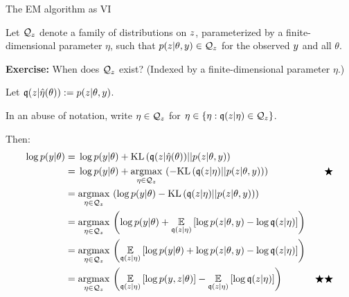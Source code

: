
\begin{frame}{The EM algorithm as VI}

Let $\mathcal{Q}_z$ denote a family of distributions on $z$, parameterized by a
finite-dimensional parameter $\eta$, such that $p(z | \theta, y) \in \mathcal{Q}_z$
for the observed $y$ and all $\theta$.

\textbf{Exercise:} When does $\mathcal{Q}_z$ exist?  (Indexed by a
finite-dimensional parameter $\eta$.)

\pause

Let $\mathfrak{q}(z | \hat{\eta}(\theta)) := p(z | \theta, y)$.

In an abuse of notation,
write $\eta \in \mathcal{Q}_z$ for $\eta \in \{\eta: \mathfrak{q}(z | \eta) \in \mathcal{Q}_z \}$.

\pause

Then:
%
\begin{align*}
%
\log p(\y | \theta) ={}&
\log p(\y | \theta) + \kl{\q(\z | \etaopt(\theta))}{p(\z | \theta, \y)}
\\={}&
\log p(\y | \theta) + \argmax{\eta \in \qdom_z}\left( -
    \kl{\q(\z | \eta)}{p(\z | \theta, \y)} \right) & \bigstar
\\={}&
\argmax{\eta \in \qdom_z} \left(
    \log p(\y | \theta) -
    \kl{\q(\z | \eta)}{p(\z | \theta, \y)}\right)
\\={}&
\argmax{\eta \in \qdom_z} \left(
\log p(\y | \theta) +
\expect{\q(\z | \eta)}{
    \log p(\z | \theta, \y) - \log \q(\z | \eta)
}\right)
\\={}&
\argmax{\eta \in \qdom_z} \left(
\expect{\q(\z | \eta)}{
    \log p(\y | \theta) +
    \log p(\z | \theta, \y) -  \log \q(\z | \eta)
}\right)
\\={}&
\argmax{\eta \in \qdom_z} \left(
\expect{\q(\z | \eta)}{
    \log p(\y, \z | \theta) }
- \expect{\q(\z | \eta)}{\log \q(\z | \eta)
}\right) & \bigstar\bigstar
%
\end{align*}
%
\end{frame}




